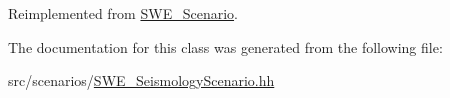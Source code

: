 Reimplemented from \hyperlink{classSWE__Scenario}{S\-W\-E\-\_\-\-Scenario}.



The documentation for this class was generated from the following file\-:\begin{DoxyCompactItemize}
\item 
src/scenarios/\hyperlink{SWE__SeismologyScenario_8hh}{S\-W\-E\-\_\-\-Seismology\-Scenario.\-hh}\end{DoxyCompactItemize}
